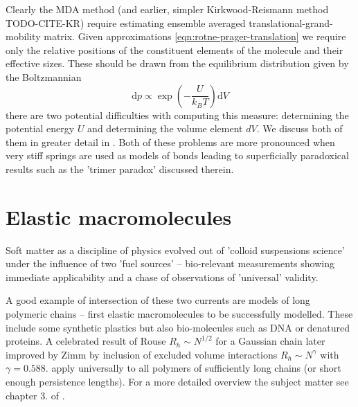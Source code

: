 \documentclass{doctoral}
\newcommand{\dd}{\mathrm{d}}
\begin{document}
Clearly the MDA method (and earlier, simpler Kirkwood-Reismann method TODO-CITE-KR) require estimating ensemble averaged translational-grand-mobility matrix.
Given approximations \eqref{eqn:rotne-prager-translation} we require only the relative positions of the constituent elements of the molecule and their effective sizes.
These should be drawn from the equilibrium distribution given by the Boltzmannian
\begin{equation}
    \dd p \propto \exp \left(- \frac{U}{k_B T} \right) \dd V
\end{equation}
there are two potential difficulties with computing this measure: determining the potential energy $U$ and determining the volume element $dV$.
We discuss both of them in greater detail in \textcite{Waszkiewicz_2024_trimer}.
Both of these problems are more pronounced when very stiff springs are used as models of bonds leading to superficially paradoxical results such as the 'trimer paradox' discussed therein.

\section{Elastic macromolecules}

Soft matter as a discipline of physics evolved out of 'colloid suspensions science' under the influence of two 'fuel sources' -- bio-relevant measurements showing immediate applicability and a chase of observations of 'universal' validity.

A good example of intersection of these two currents are models of long polymeric chains -- first elastic macromolecules to be successfully modelled.
These include some synthetic plastics but also bio-molecules such as DNA or denatured proteins.
A celebrated result of Rouse $R_h \sim N^{1/2}$ for a Gaussian chain\cite{Rouse_1953} later improved by Zimm by inclusion of excluded volume interactions \cite{Zimm_1956} $R_h \sim N^\gamma$ with $\gamma=0.588$.
apply universally to all polymers of sufficiently long chains (or short enough persistence lengths).
For a more detailed overview the subject matter see chapter 3.
of \textcite{Dhont_2008}.



\end{document}
